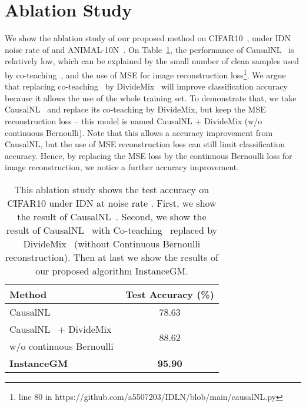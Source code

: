 \documentclass[10pt,twocolumn,letterpaper]{article}
\begin{document}
    
    


    
    
    \section{Ablation Study}
    
    We show the ablation study of our proposed method on CIFAR10~\cite{krizhevsky2009learning}, under IDN noise rate of  and ANIMAL-10N~\cite{song2019selfie}. On Table~\ref{tab:ablation_cifar}, the performance of CausalNL~\cite{yao2021instance} is relatively low, which can be explained by the small number of clean samples used by co-teaching~\cite{han2018co}, and  the use of MSE for image reconstruction loss\footnote{line 80 in https://github.com/a5507203/IDLN/blob/main/causalNL.py}.
We argue that replacing co-teaching~\cite{han2018co} by DivideMix~\cite{li2020dividemix} will improve classification accuracy because it allows the use of the whole training set. 
    To demonstrate that, we take CausalNL~\cite{yao2021instance} and replace its co-teaching by DivideMix, but keep the MSE reconstruction loss -- this model is named CausalNL + DivideMix (w/o continuous Bernoulli).
    Note that this allows a  accuracy improvement from CausalNL, but the use of MSE reconstruction loss can still limit classification accuracy.
    Hence, by replacing the MSE loss by the continuous Bernoulli loss for image reconstruction, we notice a further  accuracy improvement.  


    \begin{table}[t]
        \centering
        \caption{This ablation study shows the test accuracy  on CIFAR10 under IDN at noise rate . First, we show the result of CausalNL~\cite{yao2021instance}. Second, we show the result of CausalNL~\cite{yao2021instance} with Co-teaching~\cite{han2018co} replaced by DivideMix~\cite{li2020dividemix} (without Continuous Bernoulli reconstruction). Then at last we show the results of our proposed algorithm InstanceGM. 
}
        \label{tab:ablation_cifar}
        \begin{tabular}{l c}
            \toprule
            \bfseries Method &  \bfseries Test Accuracy (\%) \\
            \midrule
CausalNL~\cite{yao2021instance} & 78.63 \\
            CausalNL~\cite{yao2021instance} + DivideMix~\cite{li2020dividemix}  & \multirow{2}{*}{88.62} \\
            \quad * w/o continuous Bernoulli   & \\
            \rowcolor{Gray!25} \textbf{InstanceGM} & \textbf{95.90} \\
            \bottomrule
        \end{tabular}
    \end{table}
    
\end{document}
